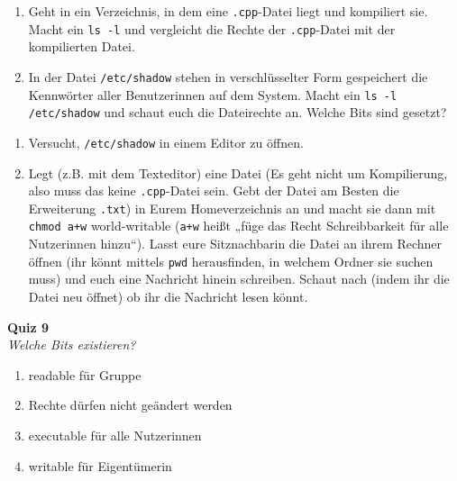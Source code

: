 \begin{praxis}
    \begin{enumerate}
        \item Geht in ein Verzeichnis, in dem eine \texttt{.cpp}-Datei liegt und
              kompiliert sie. Macht ein \texttt{ls -l} und vergleicht die Rechte der
              \texttt{.cpp}-Datei mit der kompilierten Datei.
        \item In der Datei \texttt{/etc/shadow} stehen in verschlüsselter Form
              gespeichert die Kennwörter aller Benutzerinnen auf dem System. Macht ein
              \texttt{ls -l /etc/shadow} und schaut euch die Dateirechte an. Welche
              Bits sind gesetzt?
    \end{enumerate}
\end{praxis}

\begin{spiel}
\begin{enumerate}
    \item Versucht, \texttt{/etc/shadow} in einem Editor zu öffnen.
    \item Legt (z.B. mit dem Texteditor) eine Datei (Es geht nicht um
        Kompilierung, also muss das keine \texttt{.cpp}-Datei sein. Gebt der
        Datei am Besten die Erweiterung \texttt{.txt}) in Eurem Homeverzeichnis
        an und macht sie dann mit \texttt{chmod a+w} world-writable
        (\texttt{a+w} heißt „füge das Recht Schreibbarkeit für alle Nutzerinnen
        hinzu“).  Lasst eure Sitznachbarin die Datei an ihrem Rechner öffnen
        (ihr könnt mittels \texttt{pwd} herausfinden, in welchem Ordner sie
        suchen muss) und euch eine Nachricht hinein schreiben. Schaut nach
        (indem ihr die Datei neu öffnet) ob ihr die Nachricht lesen könnt.
\end{enumerate}
\end{spiel}

\textbf{Quiz 9}\\
\textit{Welche Bits existieren?}
\begin{enumerate}[label=\alph*)]
    \item readable für Gruppe
    \item Rechte dürfen nicht geändert werden
    \item executable für alle Nutzerinnen
    \item writable für Eigentümerin
\end{enumerate}

